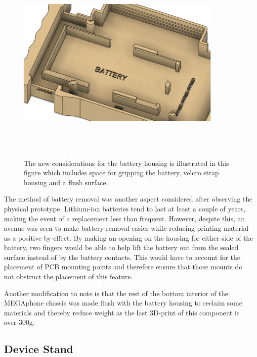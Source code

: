\begin{figure} [h]
    \centering
    \includegraphics[width=10cm,height=10cm,keepaspectratio]{Figures/battery_new.png}
    \caption{The new considerations for the battery housing is illustrated in this figure which includes space for gripping the battery, velcro strap housing and a flush surface.}
    \label{fig:NewBatteryHousing}
\end{figure}

The method of battery removal was another aspect considered after observing the physical prototype.
Lithium-ion batteries tend to last at least a couple of years, making the event of a replacement less than frequent.
However, despite this, an avenue was seen to make battery removal easier while reducing printing material as a positive by-effect.
By making an opening on the housing for either side of the battery, two fingers would be able to help lift the battery out from the sealed surface instead of by the battery contacts.
This would have to account for the placement of PCB mounting points and therefore ensure that those mounts do not obstruct the placement of this feature.

Another modification to note is that the rest of the bottom interior of the MEGAphone chassis was made flush with the battery housing to reclaim some materials and thereby reduce weight as the last 3D-print of this component is over 300g.

\subsection{Device Stand}

